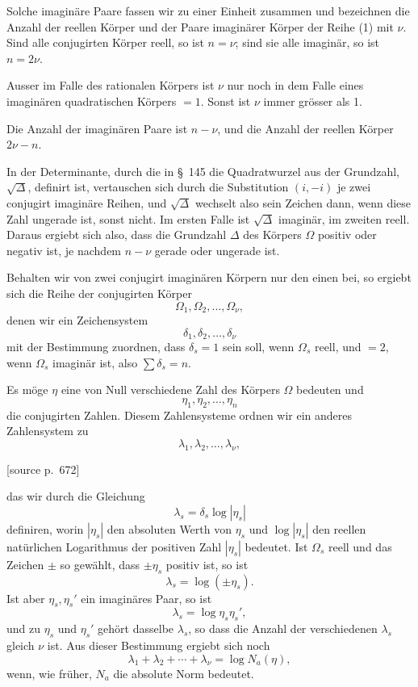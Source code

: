 \documentclass[11pt]{article}
\newcommand{\srcpage}[1]{\par\medskip\noindent\textsf{[source p.~#1]}\par\smallskip}
\begin{document}
Solche imaginäre Paare fassen wir zu einer Einheit zusammen und bezeichnen die Anzahl der reellen Körper und der Paare imaginärer Körper der Reihe (1) mit $\nu$. Sind alle conjugirten Körper reell, so ist $n=\nu$; sind sie alle imaginär, so ist $n=2\nu$.

Ausser im Falle des rationalen Körpers ist $\nu$ nur noch in dem Falle eines imaginären quadratischen Körpers $=1$. Sonst ist $\nu$ immer grösser als 1.

Die Anzahl der imaginären Paare ist $n-\nu$, und die Anzahl der reellen Körper $2\nu-n$.

In der Determinante, durch die in \S~145 die Quadratwurzel aus der Grundzahl, $\sqrt{\Delta}$, definirt ist, vertauschen sich durch die Substitution $(i,-i)$ je zwei conjugirt imaginäre Reihen, und $\sqrt{\Delta}$ wechselt also sein Zeichen dann, wenn diese Zahl ungerade ist, sonst nicht. Im ersten Falle ist $\sqrt{\Delta}$ imaginär, im zweiten reell. Daraus ergiebt sich also, dass die Grundzahl $\Delta$ des Körpers $\Omega$ positiv oder negativ ist, je nachdem $n-\nu$ gerade oder ungerade ist.

Behalten wir von zwei conjugirt imaginären Körpern nur den einen bei, so ergiebt sich die Reihe der conjugirten Körper
\[
\Omega_1,\Omega_2,\ldots,\Omega_\nu,
\]
denen wir ein Zeichensystem
\[
\delta_1,\delta_2,\ldots,\delta_\nu
\]
mit der Bestimmung zuordnen, dass $\delta_s=1$ sein soll, wenn $\Omega_s$ reell, und $=2$, wenn $\Omega_s$ imaginär ist, also $\sum \delta_s=n$.

Es möge $\eta$ eine von Null verschiedene Zahl des Körpers $\Omega$ bedeuten und
\[
\eta_1,\eta_2,\ldots,\eta_n
\]
die conjugirten Zahlen. Diesem Zahlensysteme ordnen wir ein anderes Zahlensystem zu
\[
\lambda_1,\lambda_2,\ldots,\lambda_\nu,
\]
\srcpage{672}
das wir durch die Gleichung
\begin{equation}
\lambda_s=\delta_s\log |\eta_s|
\tag{2}
\end{equation}
definiren, worin $|\eta_s|$ den absoluten Werth von $\eta_s$ und $\log|\eta_s|$ den reellen natürlichen Logarithmus der positiven Zahl $|\eta_s|$ bedeutet. Ist $\Omega_s$ reell und das Zeichen $\pm$ so gewählt, dass $\pm\eta_s$ positiv ist, so ist
\[
\lambda_s=\log(\pm\eta_s).
\]
Ist aber $\eta_s,\eta_s'$ ein imaginäres Paar, so ist
\[
\lambda_s=\log\eta_s\eta_s',
\]
und zu $\eta_s$ und $\eta_s'$ gehört dasselbe $\lambda_s$, so dass die Anzahl der verschiedenen $\lambda_s$ gleich $\nu$ ist. Aus dieser Bestimmung ergiebt sich noch
\begin{equation}
\lambda_1+\lambda_2+\cdots+\lambda_\nu=\log N_a(\eta),
\tag{3}
\end{equation}
wenn, wie früher, $N_a$ die absolute Norm bedeutet.
\end{document}
